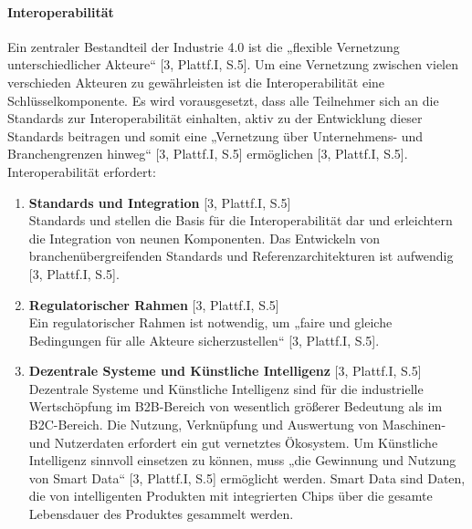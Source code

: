 \paragraph{Interoperabilität}\label{sec:Interoperabilität}
\noindent Ein zentraler Bestandteil der Industrie 4.0 ist die „flexible Vernetzung unterschiedlicher Akteure“ [3, Plattf.I, S.5]. Um eine Vernetzung zwischen vielen verschieden Akteuren zu gewährleisten ist die Interoperabilität eine Schlüsselkomponente. Es wird vorausgesetzt, dass alle Teilnehmer sich an die Standards zur Interoperabilität einhalten, aktiv zu der Entwicklung dieser Standards beitragen und somit eine „Vernetzung über Unternehmens- und Branchengrenzen hinweg“ [3, Plattf.I, S.5] ermöglichen [3, Plattf.I, S.5]. Interoperabilität erfordert:
\begin{enumerate}
	\item \textbf{Standards und Integration} [3, Plattf.I, S.5] \\
	Standards und stellen die Basis für die Interoperabilität dar und erleichtern die Integration
	von neunen Komponenten. Das Entwickeln von branchenübergreifenden Standards und
	Referenzarchitekturen ist aufwendig [3, Plattf.I, S.5].
	\item \textbf{Regulatorischer Rahmen} [3, Plattf.I, S.5] \\
	Ein regulatorischer Rahmen ist notwendig, um „faire und gleiche Bedingungen für alle
	Akteure sicherzustellen“ [3, Plattf.I, S.5].
	\item \textbf{Dezentrale Systeme und Künstliche Intelligenz} [3, Plattf.I, S.5] \\
	Dezentrale Systeme und Künstliche Intelligenz sind für die industrielle Wertschöpfung im 
	B2B-Bereich von wesentlich größerer Bedeutung als im B2C-Bereich. Die Nutzung,
	Verknüpfung und Auswertung von Maschinen- und Nutzerdaten erfordert ein gut vernetztes
	Ökosystem. Um Künstliche Intelligenz sinnvoll einsetzen zu können, muss „die Gewinnung 
	und Nutzung von Smart Data“ [3, Plattf.I, S.5] ermöglicht werden. Smart Data sind Daten, die 
	von intelligenten Produkten mit integrierten Chips über die gesamte Lebensdauer des 
	Produktes gesammelt werden.
\end{enumerate}

